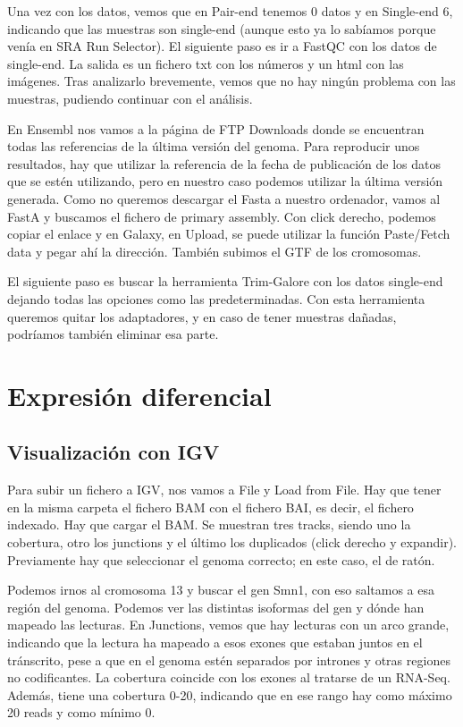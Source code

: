 Una vez con los datos, vemos que en Pair-end tenemos 0 datos y en Single-end 6, indicando que las muestras son single-end (aunque esto ya lo sabíamos porque venía en SRA Run Selector). El siguiente paso es ir a FastQC con los datos de single-end. La salida es un fichero txt con los números y un html con las imágenes. Tras analizarlo brevemente, vemos que no hay ningún problema con las muestras, pudiendo continuar con el análisis.

En Ensembl nos vamos a la página de FTP Downloads donde se encuentran todas las referencias de la última versión del genoma. Para reproducir unos resultados, hay que utilizar la referencia de la fecha de publicación de los datos que se estén utilizando, pero en nuestro caso podemos utilizar la última versión generada. Como no queremos descargar el Fasta a nuestro ordenador, vamos al FastA y buscamos el fichero de primary assembly. Con click derecho, podemos copiar el enlace y en Galaxy, en Upload, se puede utilizar la función Paste/Fetch data y pegar ahí la dirección. También subimos el GTF de los cromosomas.

El siguiente paso es buscar la herramienta Trim-Galore con los datos single-end dejando todas las opciones como las predeterminadas. Con esta herramienta queremos quitar los adaptadores, y en caso de tener muestras dañadas, podríamos también eliminar esa parte. 

\section{Expresión diferencial}
\subsection{Visualización con IGV}
Para subir un fichero a IGV, nos vamos a File y Load from File. Hay que tener en la misma carpeta el fichero BAM con el fichero BAI, es decir, el fichero indexado. Hay que cargar el BAM. Se muestran tres tracks, siendo uno la cobertura, otro los junctions y el último los duplicados (click derecho y expandir). Previamente hay que seleccionar el genoma correcto; en este caso, el de ratón. 

Podemos irnos al cromosoma 13 y buscar el gen Smn1, con eso saltamos a esa región del genoma. Podemos ver las distintas isoformas del gen y dónde han mapeado las lecturas. En Junctions, vemos que hay lecturas con un arco grande, indicando que la lectura ha mapeado a esos exones que estaban juntos en el tránscrito, pese a que en el genoma estén separados por intrones y otras regiones no codificantes. La cobertura coincide con los exones al tratarse de un RNA-Seq. Además, tiene una cobertura 0-20, indicando que en ese rango hay como máximo 20 reads y como mínimo 0. 


